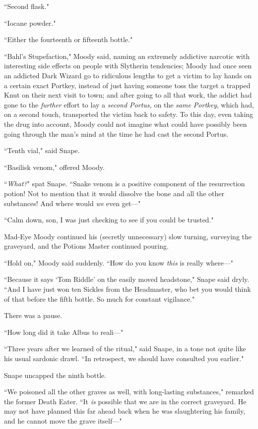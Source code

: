 ``Second flask."

``Iocane powder."

``Either the fourteenth or fifteenth bottle."

``Bahl's Stupefaction," Moody said, naming an extremely addictive narcotic with interesting side effects on people with Slytherin tendencies; Moody had once seen an addicted Dark Wizard go to ridiculous lengths to get a victim to lay hands on a certain exact Portkey, instead of just having someone toss the target a trapped Knut on their next visit to town; and after going to all that work, the addict had gone to the \emph{further} effort to lay a \emph{second Portus,} on the \emph{same Portkey}, which had, on a second touch, transported the victim back to safety. To this day, even taking the drug into account, Moody could not imagine what could have possibly been going through the man's mind at the time he had cast the second Portus.

``Tenth vial," said Snape.

``Basilisk venom," offered Moody.

``\emph{What?}" spat Snape. ``Snake venom is a positive component of the resurrection potion! Not to mention that it would dissolve the bone and all the other substances! And where would \emph{we} even get---"

``Calm down, son, I was just checking to see if you could be trusted."

Mad-Eye Moody continued his (secretly unnecessary) slow turning, surveying the graveyard, and the Potions Master continued pouring.

``Hold on," Moody said suddenly. ``How do you know \emph{this} is really where---"

``Because it says `Tom Riddle' on the easily moved headstone," Snape said dryly. ``And I have just won ten Sickles from the Headmaster, who bet you would think of that before the fifth bottle. So much for constant vigilance."

There was a pause.

``How long did it take Albus to reali---"

``Three years after we learned of the ritual," said Snape, in a tone not quite like his usual sardonic drawl. ``In retrospect, we should have consulted you earlier."

Snape uncapped the ninth bottle.

``We poisoned all the other graves as well, with long-lasting substances," remarked the former Death Eater. ``It \emph{is} possible that we are in the correct graveyard. He may not have planned this far ahead back when he was slaughtering his family, and he cannot move the grave itself---"

